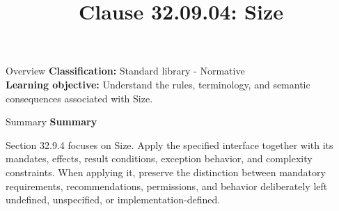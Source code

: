 \documentclass[10pt,letterpaper]{article}
\title{Clause 32.09.04: Size}
\author{}
\date{}
\begin{document}
\maketitle
\begin{CornellOverviewBox}{Overview}
\textbf{Classification:} Standard library - Normative\\[2pt]
\textbf{Learning objective:} Understand the rules, terminology, and semantic consequences associated with Size.
\end{CornellOverviewBox}\begin{CornellSummaryBox}{Summary}
{\sffamily\bfseries\color{Accent} Summary}\par\vspace{3pt}Section 32.9.4 focuses on Size. Apply the specified interface together with its mandates, effects, result conditions, exception behavior, and complexity constraints. When applying it, preserve the distinction between mandatory requirements, recommendations, permissions, and behavior deliberately left undefined, unspecified, or implementation-defined.
\end{CornellSummaryBox}
\end{document}
